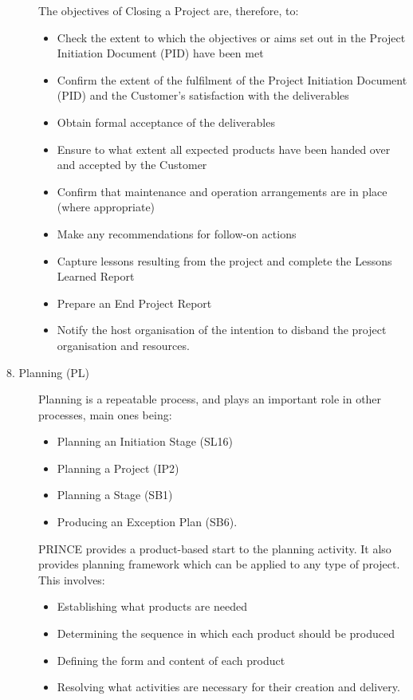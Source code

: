 \begin{minipage}[t]{0.5\linewidth}
\begin{description}
The objectives of Closing a Project are, therefore, to:
\begin{itemize}
\item Check the extent to which the objectives or aims set out in the Project
  Initiation Document (PID) have been met
\item Confirm the extent of the fulfilment of the Project Initiation Document
  (PID) and the Customer's satisfaction with the deliverables
\item Obtain formal acceptance of the deliverables
\item Ensure to what extent all expected products have been handed over and
  accepted by the Customer
\item Confirm that maintenance and operation arrangements are in place (where
  appropriate)
\item Make any recommendations for follow-on actions
\item Capture lessons resulting from the project and complete the Lessons
  Learned Report
\item Prepare an End Project Report
\item Notify the host organisation of the intention to disband the project
  organisation and resources.
\end{itemize}
\ifslides
\newpage
\fi
\item [8. Planning (PL)]
Planning is a repeatable process, and plays an important role in other
processes, main ones being:
\begin{itemize}
\item Planning an Initiation Stage (SL16)
\item Planning a Project (IP2)
\item Planning a Stage (SB1)
\item Producing an Exception Plan (SB6).
\end{itemize}
PRINCE provides a product-based start to the planning activity. It also provides planning framework which can be applied to any type of project. This involves:
\begin{itemize}
\item Establishing what products are needed
\item Determining the sequence in which each product should be produced
\item Defining the form and content of each product
\item Resolving what activities are necessary for their creation and delivery.
\end{itemize}
\end{description}

\end{minipage}
